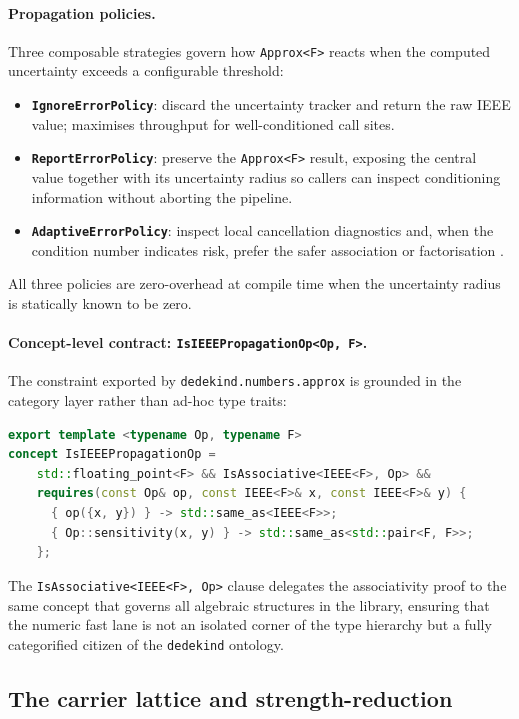\documentclass[11pt, a4paper]{report}
\begin{document}
\paragraph{Propagation policies.}
Three composable strategies govern how \texttt{Approx<F>} reacts when the computed uncertainty exceeds a configurable threshold:
\begin{itemize}
  \item \textbf{\texttt{IgnoreErrorPolicy}}: discard the uncertainty tracker and return the raw IEEE value; maximises throughput for well-conditioned call sites.
  \item \textbf{\texttt{ReportErrorPolicy}}: preserve the \texttt{Approx<F>} result, exposing the central value together with its uncertainty radius so callers can inspect conditioning information without aborting the pipeline.
  \item \textbf{\texttt{AdaptiveErrorPolicy}}: inspect local cancellation diagnostics and, when the condition number indicates risk, prefer the safer association or factorisation \cite{ogita2005accurate}.
\end{itemize}
All three policies are zero-overhead at compile time when the uncertainty radius is statically known to be zero.

\paragraph{Concept-level contract: \texttt{IsIEEEPropagationOp<Op,\,F>}.}
The constraint exported by \texttt{dedekind.numbers.approx} is grounded in the category layer rather than ad-hoc type traits:
\begin{lstlisting}[language=C++,caption={Concept grounding the propagation contract on categorical associativity.}]
export template <typename Op, typename F>
concept IsIEEEPropagationOp =
    std::floating_point<F> && IsAssociative<IEEE<F>, Op> &&
    requires(const Op& op, const IEEE<F>& x, const IEEE<F>& y) {
      { op({x, y}) } -> std::same_as<IEEE<F>>;
      { Op::sensitivity(x, y) } -> std::same_as<std::pair<F, F>>;
    };
\end{lstlisting}
The \texttt{IsAssociative<IEEE<F>, Op>} clause delegates the associativity proof to the same concept that governs all algebraic structures in the library, ensuring that the numeric fast lane is not an isolated corner of the type hierarchy but a fully categorified citizen of the \texttt{dedekind} ontology.

\subsection{The carrier lattice and strength-reduction}
\label{sec:carrier-lattice}
\end{document}
